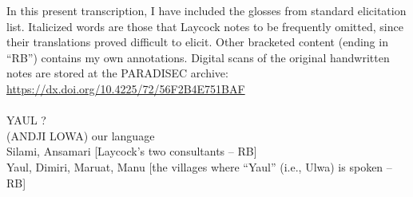   In this present transcription, I have included the glosses from  standard elicitation list. Italicized words are those that Laycock notes to be frequently omitted, since their translations proved difficult to elicit. Other bracketed content (ending in “RB”) contains my own annotations. Digital scans of the original handwritten notes are stored at the PARADISEC archive:\\

\url{https://dx.doi.org/10.4225/72/56F2B4E751BAF}\\

\\

\noindent YAUL ?\\
(ANDJI LOWA) our language\\
Silami, Ansamari [Laycock’s two consultants -- RB]\\
Yaul, Dimiri, Maruat, Manu [the villages where “Yaul” (i.e., Ulwa) is spoken -- RB]\\

